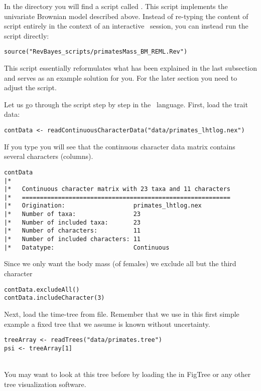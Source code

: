 In the directory  you will find a script called .
This script implements the univariate Brownian model described above. Instead of re-typing the content of script entirely in the context of an interactive \RevBayes~session, you can instead run the script directly:
{\tt \small \begin{snugshade*}
\begin{lstlisting}
source("RevBayes_scripts/primatesMass_BM_REML.Rev")
\end{lstlisting}
\end{snugshade*}}
This script essentially reformulates what has been explained in the last subsection and serves as an example solution for you. For the later section you need to adjust the script.

Let us go through the script step by step in the \Rev~language.
First, load the trait data:
{\tt \small \begin{snugshade*}
\begin{lstlisting}
contData <- readContinuousCharacterData("data/primates_lhtlog.nex")
\end{lstlisting}
\end{snugshade*}}
If you type you will see that the continuous character data matrix contains several characters (columns). 
{\tt \small \begin{snugshade*}
\begin{lstlisting}
contData
|*
|*   Continuous character matrix with 23 taxa and 11 characters
|*   ==========================================================
|*   Origination:                   primates_lhtlog.nex
|*   Number of taxa:                23
|*   Number of included taxa:       23
|*   Number of characters:          11
|*   Number of included characters: 11
|*   Datatype:                      Continuous
\end{lstlisting}
\end{snugshade*}}
Since we only want the body mass (of females) we exclude all but the third character
{\tt \small \begin{snugshade*}
\begin{lstlisting}
contData.excludeAll()
contData.includeCharacter(3) 
\end{lstlisting}
\end{snugshade*}}

Next, load the time-tree from file. Remember that we use in this first simple example a fixed tree that we assume is known without uncertainty.
{\tt \small \begin{snugshade*}
\begin{lstlisting}
treeArray <- readTrees("data/primates.tree")
psi <- treeArray[1]
\end{lstlisting}
\end{snugshade*}}
\noindent \\ \impmark You may want to look at this tree before by loading the  in FigTree or any other tree visualization software.

